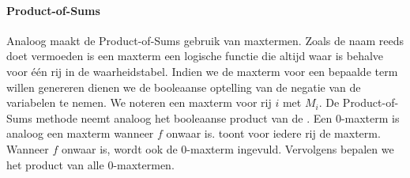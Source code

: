 \paragraph{Product-of-Sums} Analoog maakt de Product-of-Sums gebruik van maxtermen. Zoals de naam reeds doet vermoeden is een maxterm een logische functie die altijd waar is behalve voor \'e\'en rij in de waarheidstabel. Indien we de maxterm voor een bepaalde term willen genereren dienen we de booleaanse optelling van de negatie van de variabelen te nemen. We noteren een maxterm voor rij $i$ met $M_i$. De Product-of-Sums methode neemt analoog het booleaanse product van de . Een 0-maxterm is analoog een maxterm wanneer $f$ onwaar is.  toont voor iedere rij de maxterm. Wanneer $f$ onwaar is, wordt ook de 0-maxterm ingevuld. Vervolgens bepalen we het product van alle 0-maxtermen.
